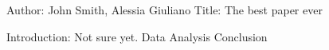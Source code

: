 Author: John Smith, Alessia Giuliano
Title: The best paper ever

Introduction: Not sure yet.
Data
Analysis
Conclusion